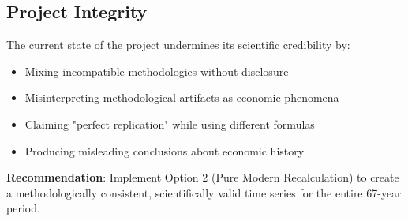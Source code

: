 \documentclass[12pt]{article}
\begin{document}
\subsection{Project Integrity}

The current state of the project undermines its scientific credibility by:
\begin{itemize}
    \item Mixing incompatible methodologies without disclosure
    \item Misinterpreting methodological artifacts as economic phenomena
    \item Claiming "perfect replication" while using different formulas
    \item Producing misleading conclusions about economic history
\end{itemize}

\textbf{Recommendation}: Implement Option 2 (Pure Modern Recalculation) to create a methodologically consistent, scientifically valid time series for the entire 67-year period.
\end{document}
